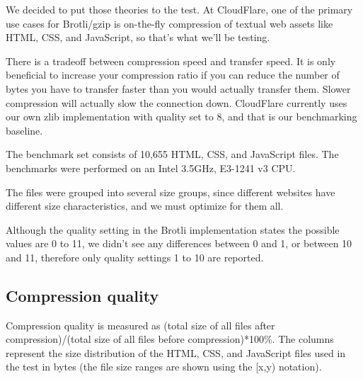 \documentclass[12pt]{article}
\begin{document}
We decided to put those theories to the test. At CloudFlare, one of the
primary use cases for Brotli/gzip is on-the-fly compression of textual
web assets like HTML, CSS, and JavaScript, so that’s what we’ll be
testing.

There is a tradeoff between compression speed and transfer speed. It is
only beneficial to increase your compression ratio if you can reduce the
number of bytes you have to transfer faster than you would actually
transfer them. Slower compression will actually slow the connection
down. CloudFlare currently uses our own zlib implementation with quality
set to 8, and that is our benchmarking baseline.

The benchmark set consists of 10,655 HTML, CSS, and JavaScript files.
The benchmarks were performed on an Intel 3.5GHz, E3-1241 v3 CPU.

The files were grouped into several size groups, since different
websites have different size characteristics, and we must optimize for
them all.

Although the quality setting in the Brotli implementation states the
possible values are 0 to 11, we didn't see any differences between 0 and
1, or between 10 and 11, therefore only quality settings 1 to 10 are
reported.

\subsection{Compression quality}

Compression quality is measured as (total size of all files after
compression)/(total size of all files before compression)*100\%. The
columns represent the size distribution of the HTML, CSS, and JavaScript
files used in the test in bytes (the file size ranges are shown using
the [x,y) notation).
\end{document}

